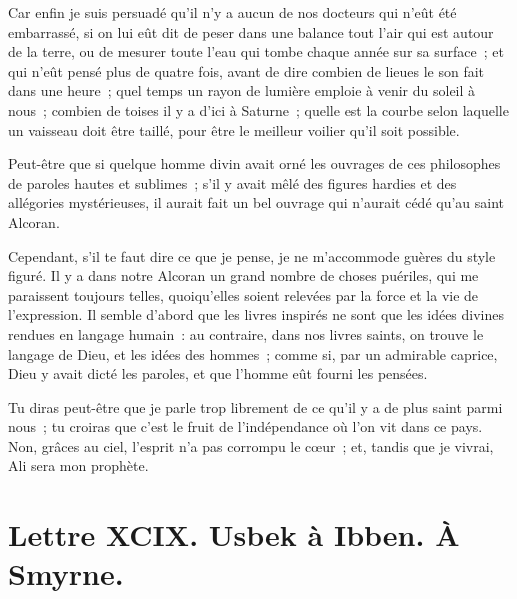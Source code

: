 \documentclass[french,twoside]{book} %
\newcommand{\dateline}[1]{\medskip{\RaggedLeft{#1}\par}\bigskip}
\begin{document}
Car enfin je suis persuadé qu’il n’y a aucun de nos docteurs qui n’eût été embarrassé, si on lui eût dit de peser dans une balance tout l’air qui est autour de la terre, ou de mesurer toute l’eau qui tombe chaque année sur sa surface ; et qui n’eût pensé plus de quatre fois, avant de dire combien de lieues le son fait dans une heure ; quel temps un rayon de lumière emploie à venir du soleil à nous ; combien de toises il y a d’ici à Saturne ; quelle est la courbe selon laquelle un vaisseau doit être taillé, pour être le meilleur voilier qu’il soit possible.\par
Peut-être que si quelque homme divin avait orné les ouvrages de ces philosophes de paroles hautes et sublimes ; s’il y avait mêlé des figures hardies et des allégories mystérieuses, il aurait fait un bel ouvrage qui n’aurait cédé qu’au saint Alcoran.\par
Cependant, s’il te faut dire ce que je pense, je ne m’accommode guères du style figuré. Il y a dans notre Alcoran un grand nombre de choses puériles, qui me paraissent toujours telles, quoiqu’elles soient relevées par la force et la vie de l’expression. Il semble d’abord que les livres inspirés ne sont que les idées divines rendues en langage humain : au contraire, dans nos livres saints, on trouve le langage de Dieu, et les idées des hommes ; comme si, par un admirable caprice, Dieu y avait dicté les paroles, et que l’homme eût fourni les pensées.\par
Tu diras peut-être que je parle trop librement de ce qu’il y a de plus saint parmi nous ; tu croiras que c’est le fruit de l’indépendance où l’on vit dans ce pays. Non, grâces au ciel, l’esprit n’a pas corrompu le cœur ; et, tandis que je vivrai, Ali sera mon prophète.\par

\dateline{À Paris, le 15 de la lune de Chahban, 1716.}
\section[{Lettre XCIX. Usbek à Ibben. À Smyrne.}]{Lettre XCIX. Usbek à Ibben. À Smyrne.}\renewcommand{\leftmark}{Lettre XCIX. Usbek à Ibben. À Smyrne.}
\end{document}
